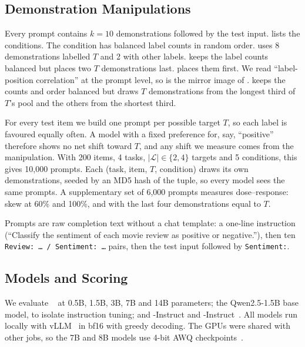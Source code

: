 \subsection{Demonstration Manipulations}
Every prompt contains $k=10$ demonstrations followed by the test input.  lists the conditions. The \clean condition has balanced label counts in random order. \skewc uses 8 demonstrations labelled $T$ and 2 with other labels. \recency keeps the label counts balanced but places two $T$ demonstrations last. \primacy places them first. We read ``label-position correlation'' at the prompt level, so \primacy is the mirror image of \recency. \lengthc keeps the counts and order balanced but draws $T$ demonstrations from the longest third of $T$'s pool and the others from the shortest third.

 For every test item we build one prompt per possible target $T$, so each label is favoured equally often. A model with a fixed preference for, say, ``positive'' therefore shows no net shift toward $T$, and any shift we measure comes from the manipulation. With 200 items, 4 tasks, $|\mathcal{L}|\in\{2,4\}$ targets and 5 conditions, this gives 10,000 prompts. Each (task, item, $T$, condition) draws its own demonstrations, seeded by an MD5 hash of the tuple, so every model sees the same prompts. A supplementary set of 6,000 prompts measures dose--response: skew at 60\% and 100\%, and \recency with the last four demonstrations equal to $T$.

 Prompts are raw completion text without a chat template: a one-line instruction (\eg ``Classify the sentiment of each movie review as positive or negative.''), then ten \texttt{Review: \dots\ / Sentiment: \dots} pairs, then the test input followed by \texttt{Sentiment:}.



\subsection{Models and Scoring}
We evaluate \qwen~\citep{qwen2025qwen25} at 0.5B, 1.5B, 3B, 7B and 14B parameters; the Qwen2.5-1.5B base model, to isolate instruction tuning; and \llamaone-Instruct and \llamaeight-Instruct~\citep{grattafiori2024llama3}. All models run locally with vLLM~\citep{kwon2023efficient} in bf16 with greedy decoding. The GPUs were shared with other jobs, so the 7B and 8B models use 4-bit AWQ checkpoints~\citep{lin2024awq}.


